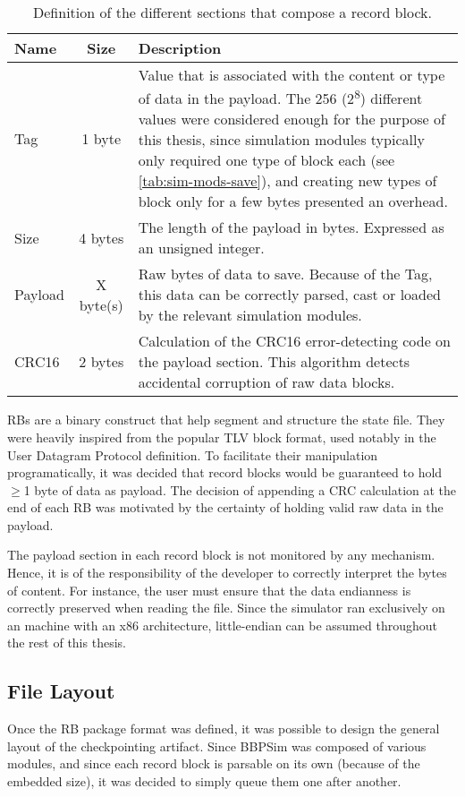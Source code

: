 {\begin{table}[h]
	\vspace{12pt}
	\centering
	\begin{tabularx}{\linewidth}{l c X}
		\toprule
		{\bfseries Name}&{\bfseries Size}&{\bfseries Description}\\
		\midrule
		Tag & 1 byte & Value that is associated with the content or type of data in the payload. The 256 (2\textsuperscript{8}) different values were considered enough for the purpose of this thesis, since simulation modules typically only required one type of block each (see \autoref{tab:sim-mods-save}), and creating new types of block only for a few bytes presented an overhead.\\
		\midrule
		Size & 4 bytes & The length of the payload in bytes. Expressed as an unsigned integer.\\
		\midrule
		Payload & {X byte(s)} & Raw bytes of data to save. Because of the Tag, this data can be correctly parsed, cast or loaded by the relevant simulation modules.\\
		\midrule
		CRC16 & 2 bytes & Calculation of the CRC16 error-detecting code on the payload section. This algorithm detects accidental corruption of raw data blocks.\\
		\bottomrule	
	\end{tabularx}
	\caption{Definition of the different sections that compose a record block.}
	\label{tab:rb-fields}
\end{table}

RBs are a binary construct that help segment and structure the state file. They were heavily inspired from the popular \gls{TLV} block format, used notably in the User Datagram Protocol definition\cite{report:udp}. To facilitate their manipulation programatically, it was decided that record blocks would be guaranteed to hold $\geq$1 byte of data as payload. The decision of appending a \gls{CRC} calculation at the end of each RB was motivated by the certainty of holding valid raw data in the payload.

The payload section in each record block is not monitored by any mechanism. Hence, it is of the responsibility of the developer to correctly interpret the bytes of content. For instance, the user must ensure that the data endianness is correctly preserved when reading the file. Since the simulator ran exclusively on an machine with an x86 architecture, little-endian can be assumed throughout the rest of this thesis.

\subsection*{File Layout}
Once the RB package format was defined, it was possible to design the general layout of the checkpointing artifact. Since \gls{BBPSim} was composed of various modules, and since each record block is parsable on its own (because of the embedded size), it was decided to simply queue them one after another. 

}
